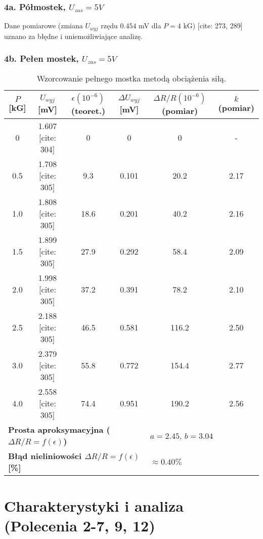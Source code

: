 \documentclass[12pt, a4paper]{article}
\begin{document}
	\subsubsection{4a. Półmostek, $U_{zas} = 5 V$}
	 Dane pomiarowe (zmiana $U_{wyj}$ rzędu $0.454$ mV dla $P=4$ kG) [cite: 273, 289] uznano za błędne i uniemożliwiające analizę.
	
	\subsubsection{4b. Pełen mostek, $U_{zas} = 5 V$}
	
	\begin{table}[H]
		\centering
		\caption{Wzorcowanie pełnego mostka metodą obciążenia siłą.}
		\begin{tabular}{cccccc}
			\toprule
			$P$ [kG] & $U_{wyj}$ [mV] & $\epsilon (10^{-6})$ (teoret.) & $\Delta U_{wyj}$ [mV] & $\Delta R/R (10^{-6})$ (pomiar) & $k$ (pomiar) \\
			\midrule
			 0 & 1.607 [cite: 304] & 0 & 0 & 0 & - \\
			 0.5 & 1.708 [cite: 305] & 9.3 & 0.101 & 20.2 & 2.17 \\
			 1.0 & 1.808 [cite: 305] & 18.6 & 0.201 & 40.2 & 2.16 \\
			 1.5 & 1.899 [cite: 305] & 27.9 & 0.292 & 58.4 & 2.09 \\
			 2.0 & 1.998 [cite: 305] & 37.2 & 0.391 & 78.2 & 2.10 \\
			 2.5 & 2.188 [cite: 305] & 46.5 & 0.581 & 116.2 & 2.50 \\
			 3.0 & 2.379 [cite: 305] & 55.8 & 0.772 & 154.4 & 2.77 \\
			 4.0 & 2.558 [cite: 305] & 74.4 & 0.951 & 190.2 & 2.56 \\
			\midrule
			\multicolumn{4}{l}{\textbf{Prosta aproksymacyjna ($\Delta R/R = f(\epsilon)$)}} & \multicolumn{2}{l}{$a = 2.45$, $b = 3.04$} \\
			\multicolumn{4}{l}{\textbf{Błąd nieliniowości $\Delta R/R = f(\epsilon)$ [\%]}} & \multicolumn{2}{l}{$\approx 0.40 \%$} \\
			\bottomrule
		\end{tabular}
	\end{table}
	
	\newpage
	\section{Charakterystyki i analiza (Polecenia 2-7, 9, 12)}
	
\end{document}
